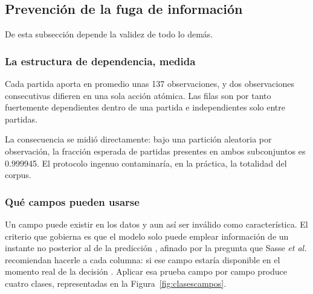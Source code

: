\subsection{Prevención de la fuga de información}
\label{subsec:leakage}

De esta subsección depende la validez de todo lo demás.

\subsubsection{La estructura de dependencia, medida}

Cada partida aporta en promedio unas 137 observaciones, y dos observaciones
consecutivas difieren en una sola acción atómica. Las filas son por tanto
fuertemente dependientes dentro de una partida e independientes solo entre
partidas.

La consecuencia se midió directamente: bajo una partición aleatoria por
observación, la fracción esperada de partidas presentes en ambos
subconjuntos es 0.999945. El protocolo ingenuo contaminaría, en la práctica,
la totalidad del corpus.

\subsubsection{Qué campos pueden usarse}

Un campo puede existir en los datos y aun así ser inválido como
característica. El criterio que gobierna es que el modelo solo puede emplear
información de un instante no posterior al de la predicción
\cite{kaufman_leakage_2011}, afinado por la pregunta que Sasse \textit{et
al.} recomiendan hacerle a cada columna: si ese campo estaría disponible en
el momento real de la decisión \cite{sasse_leakage_2025}. Aplicar esa prueba
campo por campo produce cuatro clases, representadas en la
Figura~\ref{fig:clasescampos}.

